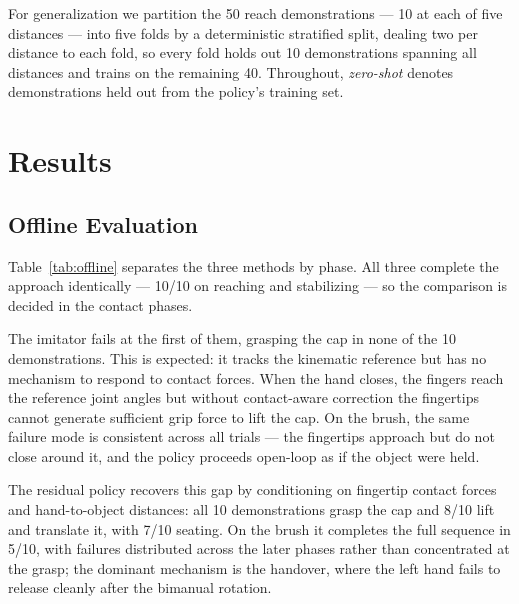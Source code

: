 \documentclass[letterpaper, 10 pt, conference]{ieeeconf}
\begin{document}
For generalization we partition the 50 reach demonstrations --- 10 at each of five
distances --- into five folds by a deterministic stratified split, dealing two per
distance to each fold, so every fold holds out 10 demonstrations spanning all distances
and trains on the remaining 40. Throughout, \emph{zero-shot} denotes demonstrations held
out from the policy's training set.

\section{Results}

\subsection{Offline Evaluation}

Table~\ref{tab:offline} separates the three methods by phase. All three complete the
approach identically --- 10/10 on reaching and stabilizing --- so the comparison is
decided in the contact phases.

The imitator fails at the first of them, grasping the cap in none of the 10
demonstrations. This is expected: it tracks the kinematic reference but has no mechanism
to respond to contact forces. When the hand closes, the fingers reach the reference
joint angles but without contact-aware correction the fingertips cannot generate
sufficient grip force to lift the cap. On the brush, the same failure mode is consistent
across all trials --- the fingertips approach but do not close around it, and the policy
proceeds open-loop as if the object were held.

The residual policy recovers this gap by conditioning on fingertip contact forces and
hand-to-object distances: all 10 demonstrations grasp the cap and 8/10 lift and
translate it, with 7/10 seating. On the brush it completes the full sequence in 5/10,
with failures distributed across the later phases rather than concentrated at the grasp;
the dominant mechanism is the handover, where the left hand fails to release cleanly
after the bimanual rotation.
\end{document}
